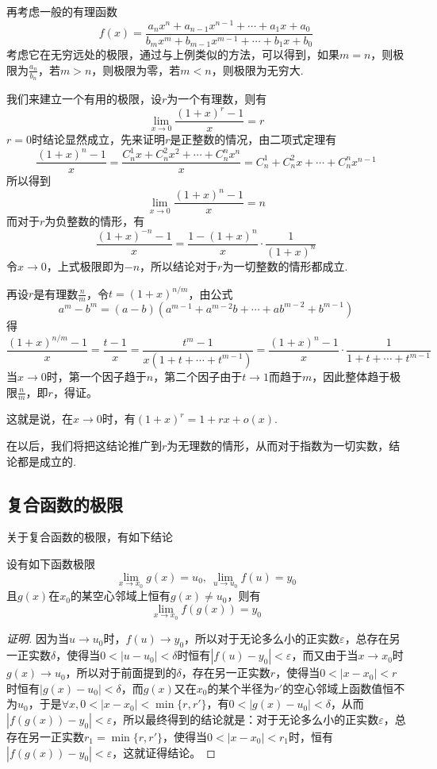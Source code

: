 \begin{example}
  \label{example:limit-of-fraction-function}
  再考虑一般的有理函数
  \[ f(x) = \frac{a_nx^n+a_{n-1}x^{n-1}+\cdots+a_1x+a_0}{b_mx^m+b_{m-1}x^{m-1}+\cdots+b_1x+b_0} \]
考虑它在无穷远处的极限，通过与上例类似的方法，可以得到，如果$m=n$，则极限为$\frac{a_n}{b_n}$，若$m>n$，则极限为零，若$m<n$，则极限为无穷大.
\end{example}

\begin{example}
  我们来建立一个有用的极限，设$r$为一个有理数，则有
  \[ \lim_{x \to 0} \frac{(1+x)^r-1}{x} = r \]
  $r=0$时结论显然成立，先来证明$r$是正整数的情况，由二项式定理有
  \[ \frac{(1+x)^n-1}{x} = \frac{C_n^1x+C_n^2x^2+\cdots+C_n^nx^n}{x} = C_n^1+C_n^2x+\cdots+C_n^nx^{n-1} \]
  所以得到
  \[ \lim_{x \to 0} \frac{(1+x)^n-1}{x} = n \]
  而对于$r$为负整数的情形，有
  \[ \frac{(1+x)^{-n}-1}{x} = \frac{1-(1+x)^n}{x} \cdot \frac{1}{(1+x)^n} \]
  令$x \to 0$，上式极限即为$-n$，所以结论对于$r$为一切整数的情形都成立.

  再设$r$是有理数$\frac{n}{m}$，令$t=(1+x)^{n/m}$，由公式
  \[ a^m-b^m=(a-b)(a^{m-1}+a^{m-2}b+\cdots+ab^{m-2}+b^{m-1}) \]
  得
  \[ \frac{(1+x)^{n/m}-1}{x} = \frac{t-1}{x} = \frac{t^m-1}{x(1+t+\cdots+t^{m-1})} = \frac{(1+x)^n-1}{x} \cdot \frac{1}{1+t+\cdots+t^{m-1}} \]
  当$x \to 0$时，第一个因子趋于$n$，第二个因子由于$t \to 1$而趋于$m$，因此整体趋于极限$\frac{n}{m}$，即$r$，得证。

  这就是说，在$x \to 0$时，有$(1+x)^r=1+rx+o(x)$.

  在以后，我们将把这结论推广到$r$为无理数的情形，从而对于指数为一切实数，结论都是成立的.
\end{example}

\subsection{复合函数的极限}
\label{sec:limit-of-composite-function}

关于复合函数的极限，有如下结论
\begin{theorem}
  \label{theorem:limit-of-combine-function}
  设有如下函数极限
  \[ \lim_{x \to x_0}g(x) = u_0, \  \lim_{u \to u_0}f(u) = y_0 \]
  且$g(x)$在$x_0$的某空心邻域上恒有$g(x) \neq u_0$，则有
  \[ \lim_{x \to x_0} f(g(x))=y_0 \]
\end{theorem}

\begin{proof}[证明]
  因为当$u \to u_0$时，$f(u) \to y_0$，所以对于无论多么小的正实数$\varepsilon$，总存在另一正实数$\delta$，使得当$0<|u-u_0|<\delta$时恒有$|f(u)-y_0|<\varepsilon$，而又由于当$x \to x_0$时$g(x) \to u_0$，所以对于前面提到的$\delta$，存在另一正实数$r$，使得当$0<|x-x_0|<r$时恒有$|g(x)-u_0|<\delta$，而$g(x)$又在$x_0$的某个半径为$r'$的空心邻域上函数值恒不为$u_0$，于是$\forall x,0<|x-x_0|<\min\{r,r'\}$，有$0<|g(x)-u_0|<\delta$，从而$|f(g(x))-y_0|<\varepsilon$，所以最终得到的结论就是：对于无论多么小的正实数$\varepsilon$，总存在另一正实数$r_1=\min\{r,r'\}$，使得当$0<|x-x_0|<r_1$时，恒有$|f(g(x))-y_0|<\varepsilon$，这就证得结论。
\end{proof}

